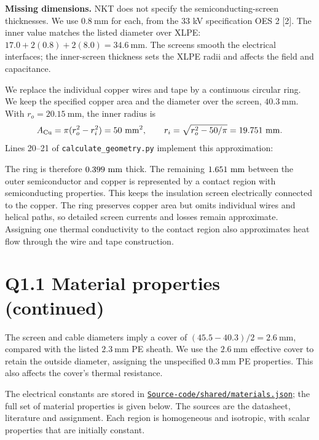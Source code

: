 \documentclass[11pt,a4paper]{article}
\newcommand{\codefile}[1]{\href{run:#1}{\nolinkurl{#1}}}
\begin{document}
\textbf{Missing dimensions.} NKT does not specify the semiconducting-screen
thicknesses. We use \(0.8~\mathrm{mm}\) for each, from the 33 kV specification
OES 2 [2]. The inner value matches the listed diameter over XLPE:
\(17.0+2(0.8)+2(8.0)=34.6~\mathrm{mm}\). The screens smooth the electrical
interfaces; the inner-screen thickness sets the XLPE radii and affects the
field and capacitance.

We replace the individual copper wires and tape by a continuous circular
ring. We keep the specified copper area and the diameter over the screen,
\(40.3~\mathrm{mm}\). With \(r_o=20.15~\mathrm{mm}\), the inner radius is
\[
 A_{\mathrm{Cu}}=\pi(r_o^2-r_i^2)=50~\mathrm{mm^2},\qquad
 r_i=\sqrt{r_o^2-50/\pi}=19.751~\mathrm{mm}.
\]
Lines 20--21 of \texttt{calculate\_geometry.py} implement this approximation:

The ring is therefore \(0.399~\mathrm{mm}\) thick. The remaining
\(1.651~\mathrm{mm}\) between the outer semiconductor and copper
is represented by a contact region with semiconducting properties. This keeps
the insulation screen electrically connected to the copper. The ring preserves
copper area but omits individual wires and helical paths, so detailed screen
currents and losses remain approximate. Assigning one thermal conductivity
to the contact region also approximates heat flow through the wire and tape
construction.

\newpage
\section*{Q1.1 Material properties (continued)}
The screen and cable diameters imply a cover of
\((45.5-40.3)/2=2.6~\mathrm{mm}\), compared with the listed \(2.3~\mathrm{mm}\)
PE sheath. We use the \(2.6~\mathrm{mm}\) effective cover to retain the outside
diameter, assigning the unspecified \(0.3~\mathrm{mm}\) PE properties. This
also affects the cover's thermal resistance.

The electrical constants are stored in
\codefile{Source-code/shared/materials.json}; the full set of material
properties is given below. The sources are the datasheet, literature and
assignment. Each region is homogeneous and isotropic, with scalar properties
that are initially constant.
\end{document}
